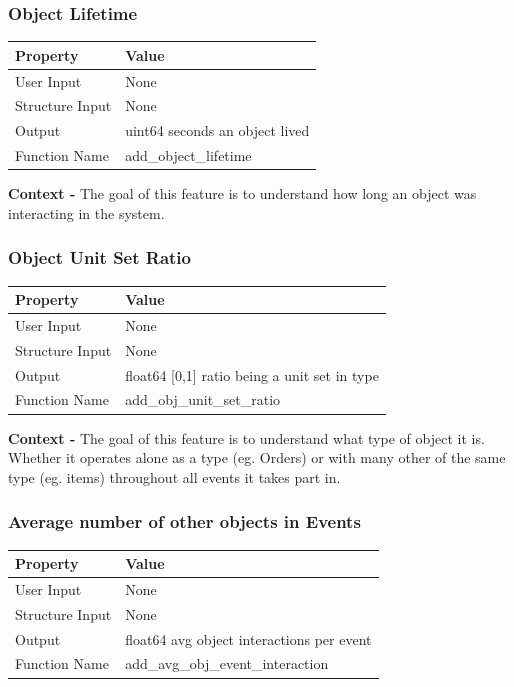 \documentclass{article}
\begin{document}
\subsubsection{Object Lifetime}
\begin{center}
	\begin{tabular}{| p{3cm} p{7cm} |}
		\hline
		\textbf{Property} & \textbf{Value}\\
		\hline
		User Input & None\\
		Structure Input & None\\
		Output & uint64 seconds an object lived\\
		Function Name & add\_object\_lifetime\\
		\hline
	\end{tabular}
\end{center}

\textbf{Context -} The goal of this feature is to understand how long an object was interacting in the system.\\

\subsubsection{Object Unit Set Ratio}
\begin{center}
	\begin{tabular}{| p{3cm} p{7cm} |}
		\hline
		\textbf{Property} & \textbf{Value}\\
		\hline
		User Input & None\\
		Structure Input & None\\
		Output & float64 [0,1] ratio being a unit set in type\\
		Function Name & add\_obj\_unit\_set\_ratio\\
		\hline
	\end{tabular}
\end{center}

\textbf{Context -} The goal of this feature is to understand what type of object it is. Whether it operates alone as a type (eg. Orders) or with many other of the same type (eg. items) throughout all events it takes part in.
\\

\subsubsection{Average number of other objects in Events} 
\begin{center}
	\begin{tabular}{| p{3cm} p{7cm} |}
		\hline
		\textbf{Property} & \textbf{Value}\\
		\hline
		User Input & None\\
		Structure Input & None\\
		Output & float64 avg object interactions per event\\
		Function Name & add\_avg\_obj\_event\_interaction\\
		\hline
	\end{tabular}
\end{center}
\end{document}
